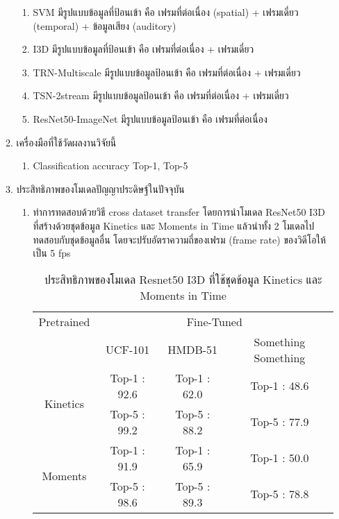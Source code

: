 \begin{enumerate}
\begin{enumerate}
			\begin{enumerate}
				\item SVM มีรูปแบบข้อมูลที่ป้อนเข้า คือ เฟรมที่ต่อเนื่อง (spatial) + เฟรมเดี่ยว (temporal) + ข้อมูลเสียง (auditory) 	
				\item I3D มีรูปแบบข้อมูลที่ป้อนเข้า คือ เฟรมที่ต่อเนื่อง + เฟรมเดี่ยว
				\item TRN-Multiscale มีรูปแบบข้อมูลป้อนเข้า คือ เฟรมที่ต่อเนื่อง + เฟรมเดี่ยว
				\item TSN-2stream มีรูปแบบข้อมูลป้อนเข้า คือ เฟรมที่ต่อเนื่อง + เฟรมเดี่ยว
				\item ResNet50-ImageNet	มีรูปแบบข้อมูลป้อนเข้า คือ เฟรมที่ต่อเนื่อง
			\end{enumerate}
		\item เครื่องมือที่ใช้วัดผลงานวิจัยนี้
			\begin{enumerate}
				\item Classification accuracy Top-1, Top-5
			\end{enumerate}
		\item ประสิทธิภาพของโมเดลปัญญาประดิษฐ์ในปัจจุบัน
			\begin{enumerate}
				\item ทำการทดสอบด้วยวิธี cross dataset transfer โดยการนำโมเดล ResNet50 I3D ที่สร้างด้วยชุดข้อมูล Kinetics และ Moments in Time 
				แล้วนำทั้ง 2 โมเดลไปทดสอบกับชุดข้อมูลอื่น โดยจะปรับอัตราความถี่ของเฟรม (frame rate) ของวิดีโอให้เป็น 5 fps
				\begin{table}[!ht]
					\centering
					\begin{tabular}{|c|c|c|c|}
						\hline
						{Pretrained}&\multicolumn{3}{c|}{Fine-Tuned}\\
						\cline{2-4}
						{}								& UCF-101			& HMDB-51			& Something Something			\\
						\hline
						\multirow{2}{*}{Kinetics}		& Top-1 : 92.6		& Top-1 : 62.0		& Top-1 : 48.6		\\
						{}								& Top-5 : 99.2		& Top-5 : 88.2		& Top-5 : 77.9		\\
						\hline
						\multirow{2}{*}{Moments}		& Top-1 : 91.9		& Top-1 : 65.9		& Top-1 : 50.0		\\
						{}								& Top-5 : 98.6		& Top-5 : 89.3		& Top-5 : 78.8		\\
						\hline
					\end{tabular}
					\caption{ประสิทธิภาพของโมเดล Resnet50 I3D ที่ใช้ชุดข้อมูล Kinetics และ Moments in Time}
					\label{tab: Data transfer performance ของโมเดล Resnet50 I3D}
				\end{table}

\end{enumerate}
\end{enumerate}
\end{enumerate}
